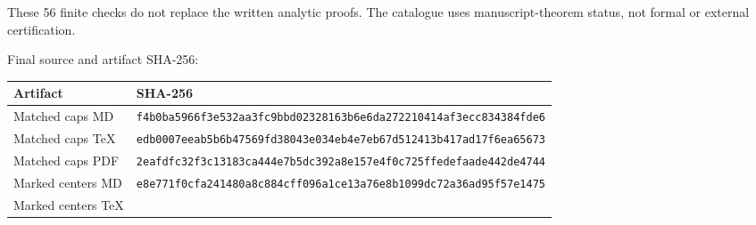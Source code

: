 \documentclass[
  10pt,
]{article}
\begin{document}
These 56 finite checks do not replace the written analytic proofs. The
catalogue uses manuscript-theorem status, not formal or external
certification.

Final source and artifact SHA-256:

\begin{longtable}[]{@{}>{\raggedright\arraybackslash}p{\dimexpr(\linewidth-2\tabcolsep)/2\relax}>{\raggedright\arraybackslash}p{\dimexpr(\linewidth-2\tabcolsep)/2\relax}@{}}
\toprule
\begin{minipage}[b]{0.47\columnwidth}\raggedright
Artifact\strut
\end{minipage} & \begin{minipage}[b]{0.47\columnwidth}\raggedright
SHA-256\strut
\end{minipage}\tabularnewline
\midrule
\endhead
\begin{minipage}[t]{0.47\columnwidth}\raggedright
Matched caps MD\strut
\end{minipage} & \begin{minipage}[t]{0.47\columnwidth}\raggedright
\nolinkurl{f4b0ba5966f3e532aa3fc9bbd02328163b6e6da272210414af3ecc834384fde6}\strut
\end{minipage}\tabularnewline
\begin{minipage}[t]{0.47\columnwidth}\raggedright
Matched caps TeX\strut
\end{minipage} & \begin{minipage}[t]{0.47\columnwidth}\raggedright
\nolinkurl{edb0007eeab5b6b47569fd38043e034eb4e7eb67d512413b417ad17f6ea65673}\strut
\end{minipage}\tabularnewline
\begin{minipage}[t]{0.47\columnwidth}\raggedright
Matched caps PDF\strut
\end{minipage} & \begin{minipage}[t]{0.47\columnwidth}\raggedright
\nolinkurl{2eafdfc32f3c13183ca444e7b5dc392a8e157e4f0c725ffedefaade442de4744}\strut
\end{minipage}\tabularnewline
\begin{minipage}[t]{0.47\columnwidth}\raggedright
Marked centers MD\strut
\end{minipage} & \begin{minipage}[t]{0.47\columnwidth}\raggedright
\nolinkurl{e8e771f0cfa241480a8c884cff096a1ce13a76e8b1099dc72a36ad95f57e1475}\strut
\end{minipage}\tabularnewline
\begin{minipage}[t]{0.47\columnwidth}\raggedright
Marked centers TeX\strut

\end{minipage}
\end{longtable}
\end{document}
